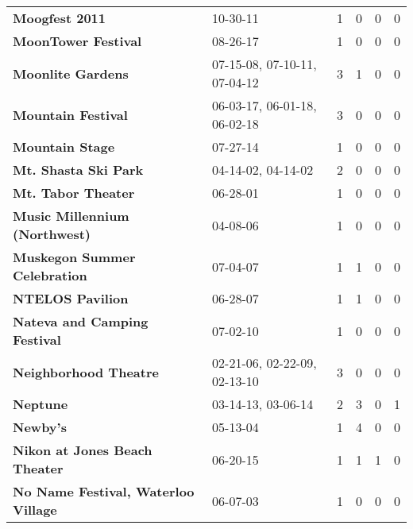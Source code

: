 \begin{supertabular}{llllll}
                                               \textbf{Moogfest 2011} &                      10-30-11 &  1 &   0 &  0 &  0 \\
                                          \textbf{MoonTower Festival} &                      08-26-17 &  1 &   0 &  0 &  0 \\
                                            \textbf{Moonlite Gardens} &  07-15-08, 07-10-11, 07-04-12 &  3 &   1 &  0 &  0 \\
                                           \textbf{Mountain Festival} &  06-03-17, 06-01-18, 06-02-18 &  3 &   0 &  0 &  0 \\
                                              \textbf{Mountain Stage} &                      07-27-14 &  1 &   0 &  0 &  0 \\
                                         \textbf{Mt. Shasta Ski Park} &            04-14-02, 04-14-02 &  2 &   0 &  0 &  0 \\
                                           \textbf{Mt. Tabor Theater} &                      06-28-01 &  1 &   0 &  0 &  0 \\
                                \textbf{Music Millennium (Northwest)} &                      04-08-06 &  1 &   0 &  0 &  0 \\
                                 \textbf{Muskegon Summer Celebration} &                      07-04-07 &  1 &   1 &  0 &  0 \\
                                             \textbf{NTELOS Pavilion} &                      06-28-07 &  1 &   1 &  0 &  0 \\
                                 \textbf{Nateva and Camping Festival} &                      07-02-10 &  1 &   0 &  0 &  0 \\
                                        \textbf{Neighborhood Theatre} &  02-21-06, 02-22-09, 02-13-10 &  3 &   0 &  0 &  0 \\
                                                     \textbf{Neptune} &            03-14-13, 03-06-14 &  2 &   3 &  0 &  1 \\
                                                     \textbf{Newby's} &                      05-13-04 &  1 &   4 &  0 &  0 \\
                                \textbf{Nikon at Jones Beach Theater} &                      06-20-15 &  1 &   1 &  1 &  0 \\
                          \textbf{No Name Festival, Waterloo Village} &                      06-07-03 &  1 &   0 &  0 &  0 \\

\end{supertabular}

